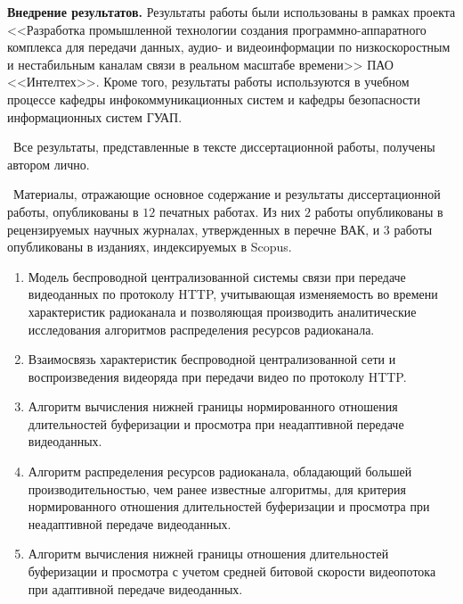 \textbf{Внедрение результатов.} Результаты работы были использованы в рамках проекта <<Разработка промышленной технологии создания программно-аппаратного комплекса для передачи данных, аудио- и видеоинформации по низкоскоростным и нестабильным каналам связи в реальном масштабе времени>> ПАО <<Интелтех>>. Кроме того, результаты работы используются в учебном процессе кафедры инфокоммуникационных систем и кафедры безопасности информационных систем ГУАП.

\contribution\ Все результаты, представленные в тексте диссертационной работы, получены автором лично.

\publications\ Материалы, отражающие основное содержание и результаты диссертационной работы, опубликованы в $12$ печатных работах. Из них $2$ работы опубликованы в рецензируемых научных журналах, утвержденных в перечне ВАК, и $3$ работы опубликованы в изданиях, индексируемых в Scopus.

\begin{enumerate}
    \item Модель беспроводной централизованной системы связи при передаче видеоданных по протоколу HTTP, учитывающая изменяемость во времени характеристик радиоканала и позволяющая производить аналитические исследования алгоритмов распределения ресурсов радиоканала.
    \item Взаимосвязь характеристик беспроводной централизованной сети и воспроизведения видеоряда при передачи видео по протоколу HTTP.
    \item Алгоритм вычисления нижней границы нормированного отношения длительностей буферизации и просмотра при неадаптивной передаче видеоданных.
    \item Алгоритм распределения ресурсов радиоканала, обладающий большей производительностью, чем ранее известные алгоритмы, для критерия нормированного отношения длительностей буферизации и просмотра при неадаптивной передаче видеоданных.
    \item Алгоритм вычисления нижней границы отношения длительностей буферизации и просмотра с учетом средней битовой скорости видеопотока при адаптивной передаче видеоданных.
\end{enumerate}
